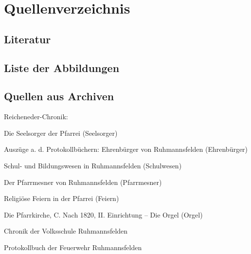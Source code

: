 \section{Quellenverzeichnis}

\subsection{Literatur}

\nocite{*}
\printbibliography[heading=none]

\subsection{Liste der Abbildungen}

\renewcommand\listfigurename{}
\listoffigures

\subsection{Quellen aus Archiven}

\noindent Reicheneder-Chronik:

\begin{compactitem}
\item Die Seelsorger der Pfarrei (Seelsorger)
\item Auszüge a. d. Protokollbüchern: Ehrenbürger von Ruhmannsfelden
(Ehrenbürger)
\item Schul- und Bildungswesen in Ruhmannsfelden (Schulwesen)
\item Der Pfarrmesner von Ruhmannsfelden (Pfarrmesner)
\item Religiöse Feiern in der Pfarrei (Feiern)
\item Die Pfarrkirche, C. Nach 1820, II. Einrichtung – Die Orgel (Orgel)
\item Chronik der Volksschule Ruhmannsfelden
\item Protokollbuch der Feuerwehr Ruhmannsfelden
\end{compactitem}